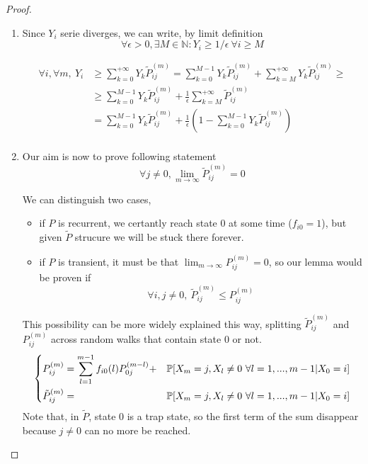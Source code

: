 \begin{proof}
\begin{enumerate}
		\item
		Since $Y_i$ serie diverges, we can write, by limit definition
		$$ \forall \epsilon > 0, \exists M \in \mathbb{N} : Y_i \ge 1 / \epsilon ~ \forall i \ge M$$

		\begin{equation}\begin{split}
			\forall i, \forall m, ~ Y_i & \ge \sum_{k=0}^{+\infty} Y_k \tilde{P}_{ij}^{(m)}
				= \sum_{k=0}^{M-1} Y_k \tilde{P}_{ij}^{(m)}
				+ \sum_{k=M}^{+\infty} Y_k \tilde{P}_{ij}^{(m)} \ge \\
			& \ge \sum_{k=0}^{M-1} Y_k \tilde{P}_{ij}^{(m)}
				+ \frac{1}{\epsilon} \sum_{k=M}^{+\infty} \tilde{P}_{ij}^{(m)} \\
			& = \sum_{k=0}^{M-1} Y_k \tilde{P}_{ij}^{(m)}
				+ \frac{1}{\epsilon} \left( 1 - \sum_{k=0}^{M-1} Y_k \tilde{P}_{ij}^{(m)} \right) \\
		\end{split}\end{equation}

		\item
		Our aim is now to prove following statement
		$$ \forall j \neq 0, \lim_{m \to \infty} \tilde{P}_{ij}^{(m)} = 0 $$

		We can distinguish two cases,
		\begin{itemize}
			\item if $P$ is recurrent, we certantly reach state 0 at some time ($f_{i0} = 1$), but given $\tilde{P}$ strucure we will be stuck there forever.
			\item if $P$ is transient, it must be that $\lim_{m \to \infty} P_{ij}^{(m)} = 0 $, so our lemma would be proven if
			$$ \forall i, j \neq 0, ~ \tilde{P}_{ij}^{(m)} \le P_{ij}^{(m)} $$
		\end{itemize}

		This possibility can be more widely explained this way, splitting $\tilde{P}_{ij}^{(m)}$ and $P_{ij}^{(m)}$ across random walks	 that contain state 0 or not.
		\begin{equation}
			\left\{ \begin{split}
				& P_{ij}^{(m)} = \sum_{l=1}^{m-1} f_{i0}(l) P_{0j}^{(m-l)} +
					& \mathbb{P}[X_m = j, X_l \neq 0 ~ \forall l = 1, ..., m-1 | X_0 = i] \\
				& \tilde{P}_{ij}^{(m)} =
					& \mathbb{P}[X_m = j, X_l \neq 0 ~ \forall l = 1, ..., m-1 | X_0 = i] \\
			\end{split} \right.
		\end{equation}
		Note that, in $\tilde{P}$, state $0$ is a trap state, so the first term of the sum disappear because $j \neq 0$ can no more be reached.


\end{enumerate}
\end{proof}
